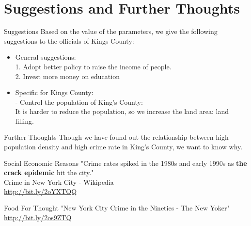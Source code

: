 \documentclass{beamer}
\begin{document}
\section{Suggestions and Further Thoughts}
\begin{frame}{Suggestions}
Based on the value of the parameters, we give the following suggestions to the officials of Kings County:
\begin{itemize}
\item General suggestions:\\
1. Adopt better policy to raise the income of people.\\
2. Invest more money on education
\item Specific for Kings County:\\
- Control the population of King's County:\\
It is harder to reduce the population, so we increase the land area: land filling.
\end{itemize}

\end{frame}

\begin{frame}{Further Thoughts}
Though we have found out the relationship between high population density and high crime rate in King's County, we want to know why.

\begin{block}{Social Economic Reasons}
"Crime rates spiked in the 1980s and early 1990s as \textbf{the crack epidemic} hit the city."\\
\bigbreak
\small{Crime in New York City - Wikipedia\\ \url{http://bit.ly/2oYXTQQ}}
\end{block}

\begin{block}{Food For Thought}
"New York City Crime in the Nineties - The New Yoker"\\
\bigbreak
\small{\url{http://bit.ly/2os9ZTQ}}
\end{block}

\end{frame}
\end{document}

